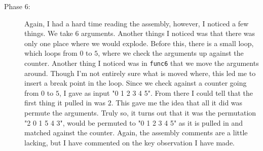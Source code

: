 \documentclass[a4paper]{article}
\begin{document}
\begin{description}
  \item[Phase 6:] Again, I had a hard time reading the assembly, however, I noticed a few things. We take $6$ arguments. Another things I noticed was that there was only one place where we would explode. Before this, there is a small loop, which loops from $0$ to $5$, where we check the arguments up against the counter. Another thing I noticed was in \texttt{func6} that we move the arguments around. Though I'm not entirely sure what is moved where, this led me to insert a break point in the loop. Since we check against a counter going from $0$ to $5$, I gave as input "0 1 2 3 4 5". From there I could tell that the first thing it pulled in was $2$. This gave me the idea that all it did was permute the arguments. Truly so, it turns out that it was the permutation "2 0 1 5 4 3", would be permuted to "0 1 2 3 4 5" as it is pulled in and matched against the counter. Again, the assembly comments are a little lacking, but I have commented on the key observation I have made.
\end{description}
\end{document}
